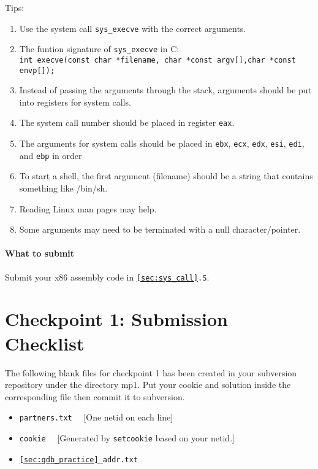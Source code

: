 \documentclass[letterpaper,12pt]{report}
\begin{document}
{Tips:
\begin{enumerate}
\item Use the system call \texttt{sys\_execve} with the correct arguments.
\item The funtion signature of \texttt{sys\_execve} in C: \\ \texttt{int execve(const char *filename, char *const argv[],char *const envp[]);}
\item Instead of passing the arguments through the stack, arguments should be put into registers for system calls.
\item The system call number should be placed in register \texttt{eax}.
\item The arguments for system calls should be placed in \texttt{ebx}, \texttt{ecx}, \texttt{edx}, \texttt{esi}, \texttt{edi}, and \texttt{ebp} in order
\item To start a shell, the first argument (filename) should be a string that contains something like /bin/sh.
\item Reading Linux man pages may help.
\item Some arguments may need to be terminated with a null character/pointer.

\end{enumerate}

\paragraph{What to submit}
Submit your x86 assembly code in \texttt{\ref{sec:sys_call}.S}. 

\section*{Checkpoint 1: Submission Checklist}

The following blank files for checkpoint 1 has been created in your subversion repository under the directory mp1.  Put your cookie and solution inside the corresponding file then commit it to subversion.

\medskip

\begin{itemize}

\item \texttt{partners.txt} \ \ [One netid on each line]

\item \texttt{cookie} \ \ [Generated by \texttt{setcookie} based on your netid.]

\item \texttt{\ref{sec:gdb_practice}\_addr.txt}


\end{itemize}}
\end{document}

